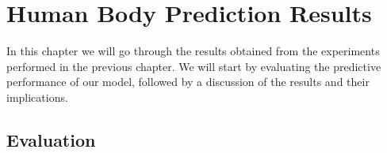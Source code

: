
\chapter{Human Body Prediction Results}\label{chap:results}

In this chapter we will go through the results obtained from the experiments
performed in the previous chapter. We will start by evaluating the predictive
performance of our model, followed by a discussion of the results and their
implications.

\section{Evaluation}

